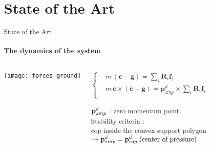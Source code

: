\section{State of the Art}

\begin{frame}{State of the Art}
\framesubtitle{The dynamics of the system}

\begin{columns}
\column{4cm}
\begin{cadre}

\begin{center}
\texttt{[image: forces-ground]}
\end{center}

\end{cadre}

\column{6cm}    
\begin{cadre}

\begin{equation*}
\left\lbrace
\begin{aligned}
&m\,( \mathbf{ \ddot{c} } - \mathbf{g}) = \sum_{i} \mathbf{R} _{i} \mathbf{f} _{i}   \\
&m \,\mathbf{c} \times ( \mathbf {\ddot{c}} - \mathbf{g} ) = \mathbf{p}^d_{zmp} \times \sum_{i} \mathbf{R} _{i} \mathbf{f} _{i}\\
\end{aligned}
\right.
\label{eq:underactuated_dynamics}
\end{equation*}

${\bf p}_{zmp}^d$ : zero momentum point.\\

Stability criteria : \\
{\color{black!20!red} cop inside the convex support polygon}\\
$ \rightarrow {\bf p}^d_{zmp} = {\bf p}^d_{cop}
\; \text{(center of pressure)} $
\end{cadre}
\end{columns}

\end{frame}


